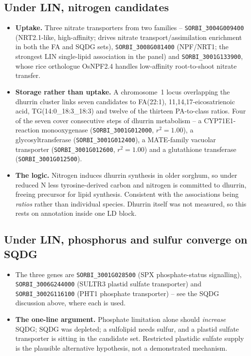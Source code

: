 \documentclass[11pt]{article}
\newcommand{\lead}[1]{\textbf{#1}}
\begin{document}
\subsection{Under LIN, nitrogen candidates}
\begin{itemize}
  \item \lead{Uptake.} Three nitrate transporters from two families --
        \texttt{SORBI\_3004G009400} (NRT2.1-like, high-affinity; drives nitrate
        transport/assimilation enrichment in both the FA and SQDG sets),
        \texttt{SORBI\_3008G081400} (NPF/NRT1; the strongest LIN single-lipid
        association in the panel) and \texttt{SORBI\_3001G133900}, whose rice
        orthologue OsNPF2.4 handles low-affinity root-to-shoot nitrate transfer.
  \item \lead{Storage rather than uptake.} A chromosome~1 locus overlapping the
        dhurrin cluster links seven candidates to FA(22:1),
        11,14,17-eicosatrienoic acid, TG(14:0\_18:3\_18:3) and twelve of the
        thirteen PA-to-class ratios. Four of the seven cover consecutive steps of
        dhurrin metabolism -- a CYP71E1-reaction monooxygenase
        (\texttt{SORBI\_3001G012000}, $r^2=1.00$), a glycosyltransferase
        (\texttt{SORBI\_3001G012400}), a MATE-family vacuolar transporter
        (\texttt{SORBI\_3001G012600}, $r^2=1.00$) and a glutathione transferase
        (\texttt{SORBI\_3001G012500}).
  \item \lead{The logic.} Nitrogen induces dhurrin synthesis in older sorghum, so
        under reduced N less tyrosine-derived carbon and nitrogen is committed to
        dhurrin, freeing precursor for lipid synthesis. Consistent with the
        associations being \emph{ratios} rather than individual species. Dhurrin
        itself was not measured, so this rests on annotation inside one LD block.
\end{itemize}

\subsection{Under LIN, phosphorus and sulfur converge on SQDG}
\begin{itemize}
  \item The three genes are \texttt{SORBI\_3001G028500} (SPX phosphate-status
        signalling), \texttt{SORBI\_3006G244000} (SULTR3 plastid sulfate
        transporter) and \texttt{SORBI\_3002G116100} (PHT1 phosphate
        transporter) -- see the SQDG discussion above, where each is used.
  \item \lead{The one-line argument.} Phosphate limitation alone should
        \emph{increase} SQDG; SQDG was depleted; a sulfolipid needs sulfur, and a
        plastid sulfate transporter is sitting in the candidate set. Restricted
        plastidic sulfate supply is the plausible alternative hypothesis, not a
        demonstrated mechanism.
\end{itemize}
\end{document}
